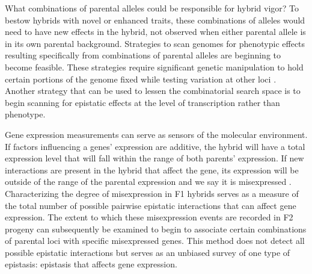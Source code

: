 

What combinations of parental alleles could be responsible for hybrid vigor? To bestow hybrids with novel or enhanced traits, these combinations of alleles would need to have new effects in the hybrid, not observed when either parental allele is in its own parental background. Strategies to scan genomes for phenotypic effects resulting specifically from combinations of parental alleles are beginning to become feasible. These strategies require significant genetic manipulation to hold certain portions of the genome fixed while testing variation at other loci \cite{Buzby2025}. Another strategy that can be used to lessen the combinatorial search space is to begin scanning for epistatic effects at the level of transcription rather than phenotype.


Gene expression measurements can serve as sensors of the molecular environment. If factors influencing a genes' expression are additive, the hybrid will have a total expression level that will fall within the range of both parents' expression. If new interactions are present in the hybrid that affect the gene, its expression will be outside of the range of the parental expression and we say it is misexpressed \cite{Landry2005}. Characterizing the degree of misexpression in F1 hybrids serves as a measure of the total number of possible pairwise epistatic interactions that can affect gene expression. The extent to which these misexpression events are recorded in F2 progeny can subsequently be examined to begin to associate certain combinations of parental loci with specific misexpressed genes. This method does not detect all possible epistatic interactions but serves as an unbiased survey of one type of epistasis: epistasis that affects gene expression.

